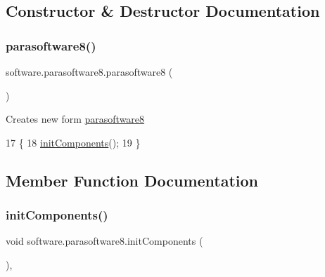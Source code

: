 \subsection{Constructor \& Destructor Documentation}
\mbox{\label{classsoftware_1_1parasoftware8_a0359e1d236b31fb9a86301dd11e12a7c}} 
\subsubsection{\texorpdfstring{parasoftware8()}{parasoftware8()}}
{\footnotesize\ttfamily software.\+parasoftware8.\+parasoftware8 (\begin{DoxyParamCaption}{ }\end{DoxyParamCaption})\hspace{0.3cm}{\ttfamily [inline]}}

Creates new form \mbox{\hyperlink{classsoftware_1_1parasoftware8}{parasoftware8}} 
\begin{DoxyCode}
17                            \{
18         \mbox{\hyperlink{classsoftware_1_1parasoftware8_af0d3201888a29fcd16582ef797d5572d}{initComponents}}();
19     \}
\end{DoxyCode}


\subsection{Member Function Documentation}
\mbox{\label{classsoftware_1_1parasoftware8_af0d3201888a29fcd16582ef797d5572d}} 
\subsubsection{\texorpdfstring{init\+Components()}{initComponents()}}
{\footnotesize\ttfamily void software.\+parasoftware8.\+init\+Components (\begin{DoxyParamCaption}{ }\end{DoxyParamCaption})\hspace{0.3cm}{\ttfamily [inline]}, {\ttfamily [private]}}

